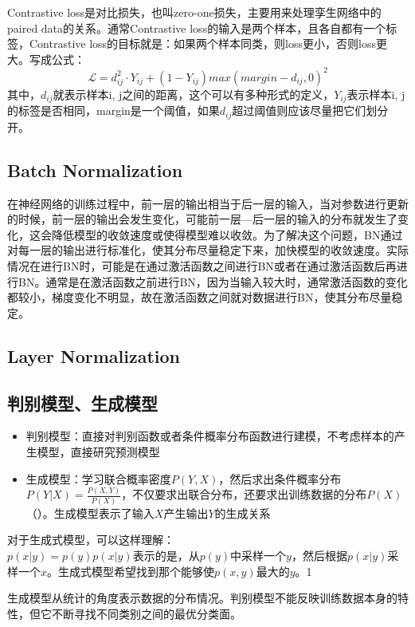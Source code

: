 Contrastive loss是对比损失，也叫zero-one损失，主要用来处理孪生网络中的paired data的关系。通常Contrastive loss的输入是两个样本，且各自都有一个标签，Contrastive loss的目标就是：如果两个样本同类，则loss更小，否则loss更大。写成公式：
$$
\mathcal{L} = d_{ij}^2 \cdot Y_{ij} + (1 - Y_{ij} )max(margin - d_{ij}, 0)^2
$$
其中，$d_{ij}$就表示样本i, j之间的距离，这个可以有多种形式的定义，$Y_{ij}$表示样本i, j的标签是否相同，margin是一个阈值，如果$d_{ij}$超过阈值则应该尽量把它们划分开。

\subsection{Batch Normalization}
在神经网络的训练过程中，前一层的输出相当于后一层的输入，当对参数进行更新的时候，前一层的输出会发生变化，可能前一层---后一层的输入的分布就发生了变化，这会降低模型的收敛速度或使得模型难以收敛。为了解决这个问题，BN通过对每一层的输出进行标准化，使其分布尽量稳定下来，加快模型的收敛速度。实际情况在进行BN时，可能是在通过激活函数之间进行BN或者在通过激活函数后再进行BN。通常是在激活函数之前进行BN，因为当输入较大时，通常激活函数的变化都较小，梯度变化不明显，故在激活函数之间就对数据进行BN，使其分布尽量稳定。

\subsection{Layer Normalization}

\subsection{判别模型、生成模型}
\begin{itemize}
	\item 判别模型：直接对判别函数或者条件概率分布函数进行建模，不考虑样本的产生模型，直接研究预测模型
	\item 生成模型：学习联合概率密度$P(Y, X)$，然后求出条件概率分布$P(Y|X) = \frac{P(X, Y)}{P(X)}$，不仅要求出联合分布，还要求出训练数据的分布$P(X)$（{\color{red}{不一定要计算$p(X)$，因为对于同一个样本，计算它属于不同分类时，其$p(X)$是一样的，对判别没有帮助}}）。生成模型表示了输入$X$产生输出$Y$的生成关系
\end{itemize}

对于生成式模型，可以这样理解：\\
$p(x | y) = p(y)p(x | y)$表示的是，从$p(y)$中采样一个$y$，然后根据$p(x|y)$采样一个$x$。生成式模型希望找到那个能够使$p(x, y)$最大的$y$。1


生成模型从统计的角度表示数据的分布情况。判别模型不能反映训练数据本身的特性，但它不断寻找不同类别之间的最优分类面。

